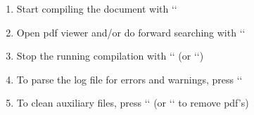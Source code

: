 \documentclass{minimal}
\begin{document}
\begin{enumerate}
  \item Start compiling the document with `\ll`
  \item Open pdf viewer and/or do forward searching with `\lv`
  \item Stop the running compilation with `\ll` (or `\lk`)
  \item To parse the log file for errors and warnings, press `\le`
  \item To clean auxiliary files, press `\lc` (or `\lC` to remove pdf's)
\end{enumerate}
\end{document}

